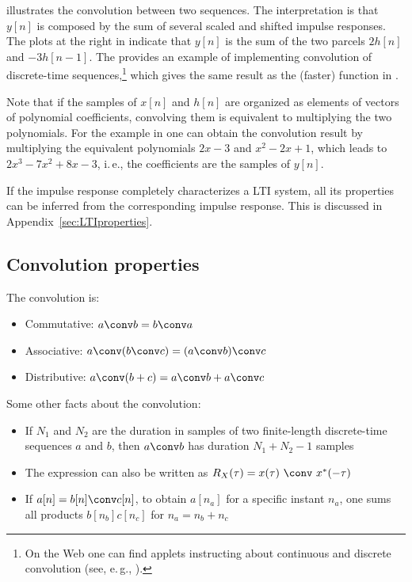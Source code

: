  illustrates the convolution between two sequences. The interpretation is that $y[n]$ is composed by the sum of several scaled and shifted impulse responses. The plots at the right in  indicate that $y[n]$ is the sum of the two parcels $2h[n]$ and $-3h[n-1]$. The  provides an example of implementing convolution of discrete-time sequences,\footnote{On the Web one can find applets instructing about continuous and discrete convolution (see, e.\,g., ).} which gives the same result as the (faster)  function in {\matlab}.



Note that if the samples of $x[n]$ and $h[n]$ are organized as elements of vectors of polynomial coefficients, convolving them is equivalent to multiplying the two polynomials. For the example in  one can obtain the convolution result
by multiplying the equivalent polynomials $2x -3$ and $x^2 -2 x + 1$, which leads to $2x^3 -7 x^2 +8 x -3$, i.\,e., the coefficients are the samples of $y[n]$.


If the impulse response completely characterizes a LTI system, all its properties can be inferred from the corresponding impulse response. This is discussed in Appendix~\ref{sec:LTIproperties}.

\subsection{{\akadvanced} Convolution properties}

The convolution is:
\begin{itemize}
	\item Commutative: $a \conv b = b \conv a$
	\item Associative: $a \conv (b \conv c) = (a \conv b) \conv c$
	\item Distributive: $a \conv (b + c) = a \conv b + a \conv c$
\end{itemize}

Some other facts about the convolution:
\begin{itemize}
	\item If $N_1$ and $N_2$ are the duration in samples of two finite-length discrete-time sequences $a$ and $b$, then $a \conv b$ has duration $N_1+N_2-1$ samples
	\item The expression  can also be written as
$R_{X}(\tau)  = x(\tau) ~\conv~ x^*(-\tau)$
	\item If $a[n]=b[n]\conv c[n]$, to obtain $a[n_a]$ for a specific instant $n_a$, one sums all products $b[n_b]c[n_c]$ for $n_a=n_b+n_c$
\end{itemize}

